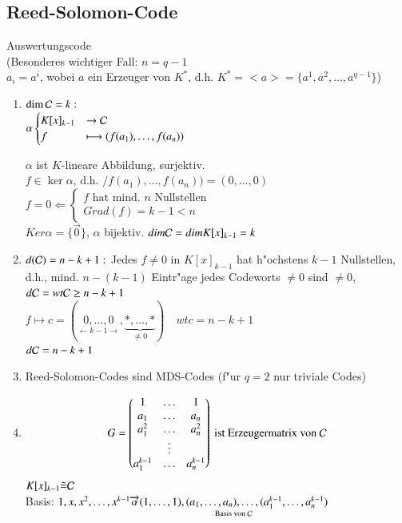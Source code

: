 \subsection{Reed-Solomon-Code} Auswertungscode \\
(Besonderes wichtiger Fall: $n=q-1$ \\
$a_i=a^i$, wobei $a$ ein Erzeuger von $K^{*}$, d.h. $K^*=<a>=\lbrace a^1,a^2,\ldots,a^{q-1} \rbrace$) %
\begin{enumerate}[(1)]
	\item
	$\dim \mathcal{C} = k:$ \\
	$\alpha \begin{cases} K[x]_{k-1} &\rightarrow \mathcal{C} \\ f &\longmapsto (f(a_1),\ldots,f(a_n)) \end{cases}$

$\alpha$ ist $K$-lineare Abbildung, surjektiv.\\
$f \in \ker \alpha$, d.h. $/f(a_1),\ldots,f(a_n))=(0,\ldots,0)$\\
$f=0 \Leftarrow \begin{cases}
f \text{ hat mind. $n$ Nullstellen} \\
Grad(f)=k-1 < n
\end{cases}$ \\
$Ker \alpha=\lbrace \vec{0} \rbrace$, $\alpha$ bijektiv. $dim \mathcal{C} = dim K[x]_{k-1}=k$
\item
	$d(\mathcal{C})=n-k+1:$ Jedes $f\neq 0$ in $K[x]_{k-1}$ hat h"ochstens $k-1$ Nullstellen, d.h., mind. $n-(k-1)$ Eintr"age jedes Codeworts $\neq 0$ sind $\neq 0$, $d \mathcal{C} = wt \mathcal{C} \geq n-k+1$\\
	$f \longmapsto c=(\underset{\leftarrow k-1 \rightarrow}{0,\ldots,0},\underset{\neq 0}{\underbrace{*,\ldots,*}})\quad wt c = n-k+1$\\
	$d \mathcal{C} = n-k+1$
	\item
	Reed-Solomon-Codes sind MDS-Codes (f"ur $q=2$ nur triviale Codes)
	\item
	\[
	G=
	\begin{pmatrix}
		1 & \ldots & 1 \\ 
		a_1 & \ldots & a_n \\ 
		a_1^2 & \ldots & a_n^2 \\ 
		 & \vdots &  \\ 
		a_1^{k-1} & \ldots & a_n^{k-1}
	\end{pmatrix} \text{ ist Erzeugermatrix von } \mathcal{C} 
	\]
	$K[x]_{k-1} \tilde{=}\mathcal{C}$\\
	Basis: $1,x,x^2,\ldots,x^{k-1} \overrightarrow{\alpha} \underset{\text{Basis von } \mathcal{C}}{(1,\ldots,1),(a_1,\ldots,a_n),\ldots,(a_1^{k-1},\ldots,a_n^{k-1})}$
\end{enumerate}
